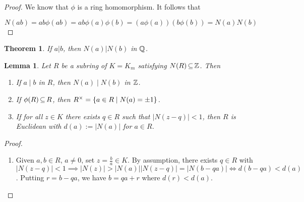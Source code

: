 \documentclass[11pt]{book}
\newcounter{counter}
\newtheorem{theorem}[counter]{Theorem}   \newtheorem*{theorem*}{Theorem}   \newtheorem{lemma}[counter]{Lemma}   \newtheorem{corollary}[counter]{Corollary}
\theoremstyle{definition}   \newtheorem{defn}[counter]{Definition} %
\newcommand{\vs}{\vspace{8pt}}
\numberwithin{counter}{chapter}
\begin{document}
\begin{proof}
	We know that $\phi$ is a ring homomorphism.  It follows that

	$$N(ab) = ab \phi(ab) = ab \phi(a) \phi(b) = (a\phi(a))(b\phi(b)) = N(a)N(b)$$
\end{proof}

\vs

\begin{theorem}
	If $a|b$, then $N(a) | N(b)$ in $\operatorname{\mathbb{Q}}$.
\end{theorem}

\vs

\begin{lemma}
Let $R$ be a subring of $K = K_m$ satisfying $N(R) \operatorname{\subseteq} \operatorname{\mathbb{Z}}$. Then
\begin{enumerate}
\item[(a)] If $a \mid b$ in $R$, then $N(a) \mid N(b)$ in $\operatorname{\mathbb{Z}}$.
\item[(b)] If $\phi(R) \operatorname{\subseteq} R$, then $R^{\times} = \{a \in R \mid N(a) = \pm1\}$.
\item[(c)] If for all $z \in K$ there exists $q \in R$ such that $|N(z-q)| < 1$, then $R$ is Euclidean with $d(a) := |N(a)|$ for $a \in R$.
\end{enumerate}
\end{lemma}
\begin{proof}
\
\begin{enumerate}
\item[(c)] Given $a,b \in R$, $a \ne 0$, set $z = \frac{b}{a} \in K$. By assumption, there exists $q \in R$ with $|N(z-q)| < 1 \implies |N(z)| > |N(a)||N(z-q)| = |N(b-qa)| \iff d(b-qa) < d(a)$. Putting $r = b-qa$, we have $b = qa + r$ where $d(r) < d(a)$.
\end{enumerate}
\end{proof}

\vs
\end{document}
